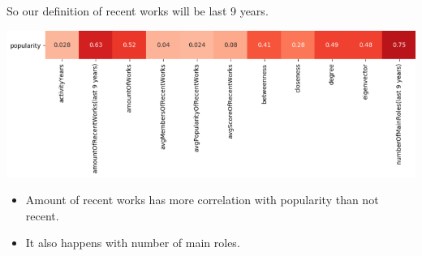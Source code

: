 \begin{frame}
So our definition of recent works will be last 9 years.
\begin{center}
\includegraphics[scale=0.45]{graphics/popCorrelationRecentWorks.png} 
\end{center}
\begin{itemize}
\item Amount of recent works has more correlation with popularity than not recent.
\item It also happens with number of main roles.
\end{itemize}
\end{frame}


